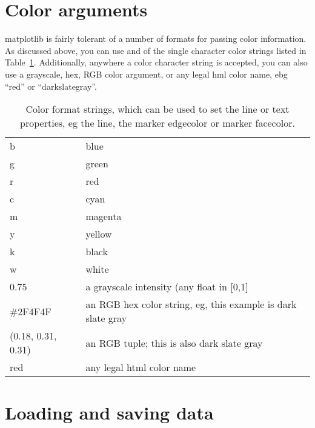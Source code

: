 \documentclass[twoside]{book}
\begin{document}
\section{Color arguments}
\label{sec:colors}


matplotlib is fairly tolerant of a number of formats for passing color
information.  As discussed above, you can use and of the single
character color strings listed in Table~\ref{tab:color_strings}.
Additionally, anywhere a color character string is accepted, you can
also use a grayscale, hex, RGB color argument, or any legal hml color
name, ebg ``red'' or ``darkslategray''.



\begin{table}[htbp]
  \centering
  \begin{tabular}[t]{|l|l|}\hline
      b  & blue\\
      g  & green\\
      r  & red\\
      c  & cyan\\
      m  & magenta\\
      y  & yellow\\
      k  & black\\
      w  & white\\
      0.75  & a grayscale intensity (any float in [0,1]\\
      \#2F4F4F & an RGB hex color string, eg, this example is dark slate
      gray\\
      (0.18, 0.31, 0.31)  & an RGB tuple; this is also dark slate gray\\
      red  & any legal html color name\\\hline
  \end{tabular}
  \caption{\label{tab:color_strings}Color format strings, which can be
      used to set the line or text properties, eg the line, the marker
      edgecolor or marker facecolor.  }
\end{table}

\section{Loading and saving data}
\label{sec:loading_data}
\end{document}
